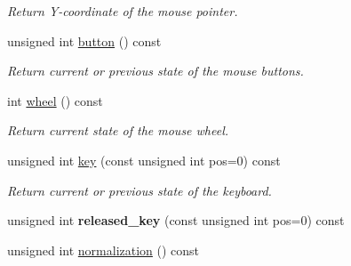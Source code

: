 \begin{DoxyCompactItemize}
\begin{DoxyCompactList}\small\item\em Return Y-\/coordinate of the mouse pointer. \item\end{DoxyCompactList}\item 
\hypertarget{structcimg__library_1_1CImgDisplay_adff5e3fda26574b001a038360b188479}{
unsigned int \hyperlink{structcimg__library_1_1CImgDisplay_adff5e3fda26574b001a038360b188479}{button} () const }
\label{structcimg__library_1_1CImgDisplay_adff5e3fda26574b001a038360b188479}

\begin{DoxyCompactList}\small\item\em Return current or previous state of the mouse buttons. \item\end{DoxyCompactList}\item 
\hypertarget{structcimg__library_1_1CImgDisplay_a3a455e002ed5dcc1fc2c23df07781522}{
int \hyperlink{structcimg__library_1_1CImgDisplay_a3a455e002ed5dcc1fc2c23df07781522}{wheel} () const }
\label{structcimg__library_1_1CImgDisplay_a3a455e002ed5dcc1fc2c23df07781522}

\begin{DoxyCompactList}\small\item\em Return current state of the mouse wheel. \item\end{DoxyCompactList}\item 
\hypertarget{structcimg__library_1_1CImgDisplay_a5e321648f3701b0ea6d9f7049cd6da38}{
unsigned int \hyperlink{structcimg__library_1_1CImgDisplay_a5e321648f3701b0ea6d9f7049cd6da38}{key} (const unsigned int pos=0) const }
\label{structcimg__library_1_1CImgDisplay_a5e321648f3701b0ea6d9f7049cd6da38}

\begin{DoxyCompactList}\small\item\em Return current or previous state of the keyboard. \item\end{DoxyCompactList}\item 
\hypertarget{structcimg__library_1_1CImgDisplay_a885a46a61297c842fe2a7a37bbee2a54}{
unsigned int {\bfseries released\_\-key} (const unsigned int pos=0) const }
\label{structcimg__library_1_1CImgDisplay_a885a46a61297c842fe2a7a37bbee2a54}

\item 
\hypertarget{structcimg__library_1_1CImgDisplay_a67719cb05110ca9e5725bc59f8350b68}{
unsigned int \hyperlink{structcimg__library_1_1CImgDisplay_a67719cb05110ca9e5725bc59f8350b68}{normalization} () const }
\label{structcimg__library_1_1CImgDisplay_a67719cb05110ca9e5725bc59f8350b68}


\end{DoxyCompactItemize}
